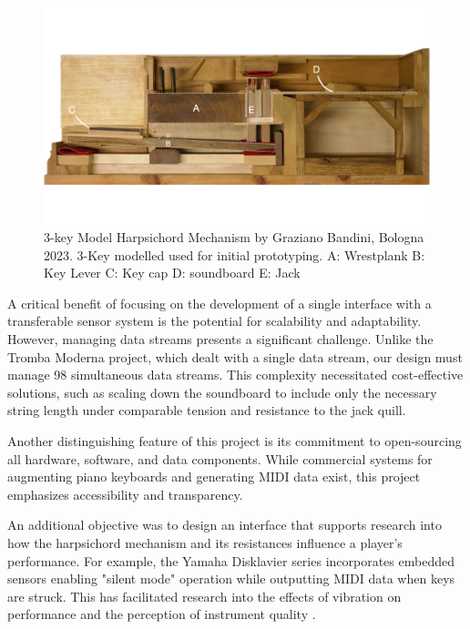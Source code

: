 \begin{figure}  
  \centering
  \includegraphics[width=\linewidth]{src/images/3-key-side-labelled.png} 
  \caption{3-key Model Harpsichord Mechanism by Graziano Bandini, Bologna 2023. 3-Key modelled used for initial prototyping. A: Wrestplank B: Key Lever C: Key cap D: soundboard E: Jack} 
  \label{fig:3key}
\end{figure}

A critical benefit of focusing on the development of a single interface with a transferable sensor system is the potential for scalability and adaptability. However, managing data streams presents a significant challenge. Unlike the Tromba Moderna project, which dealt with a single data stream, our design must manage 98 simultaneous data streams. This complexity necessitated cost-effective solutions, such as scaling down the soundboard to include only the necessary string length under comparable tension and resistance to the jack quill.

Another distinguishing feature of this project is its commitment to open-sourcing all hardware, software, and data components. While commercial systems for augmenting piano keyboards and generating MIDI data exist, this project emphasizes accessibility and transparency.

An additional objective was to design an interface that supports research into how the harpsichord mechanism and its resistances influence a player’s performance. For example, the Yamaha Disklavier series incorporates embedded sensors enabling "silent mode" operation while outputting MIDI data when keys are struck. This has facilitated research into the effects of vibration on performance \cite{MusicalHaptics2018_04, MusicalHaptics2018_13} and the perception of instrument quality \cite{MusicalHaptics2018_05}.

